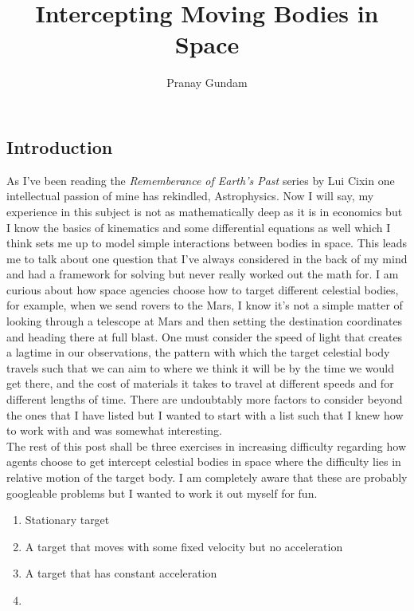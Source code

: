 \documentclass[11pt,english]{article}
\title{\textbf{Intercepting Moving Bodies in Space}}
\author{Pranay Gundam}
\begin{document}
\maketitle

\subsection*{Introduction}

\noindent As I've been reading the \textit{Rememberance of Earth's Past} series by Lui Cixin one intellectual passion of mine has rekindled, Astrophysics. Now I will say, my experience in this subject is not as mathematically deep as it is in economics but I know the basics of kinematics and some differential equations as well which I think sets me up to model simple interactions between bodies in space. This leads me to talk about one question that I've always considered in the back of my mind and had a framework for solving but never really worked out the math for. I am curious about how space agencies choose how to target different celestial bodies, for example, when we send rovers to the Mars, I know it's not a simple matter of looking through a telescope at Mars and then setting the destination coordinates and heading there at full blast. One must consider the speed of light that creates a lagtime in our observations, the pattern with which the target celestial body travels such that we can aim to where we think it will be by the time we would get there, and the cost of materials it takes to travel at different speeds and for different lengths of time. There are undoubtably more factors to consider beyond the ones that I have listed but I wanted to start with a list such that I knew how to work with and was somewhat interesting.\\

\noindent The rest of this post shall be three exercises in increasing difficulty regarding how agents choose to get intercept celestial bodies in space where the difficulty lies in relative motion of the target body. I am completely aware that these are probably googleable problems but I wanted to work it out myself for fun.
\begin{enumerate}
	\item Stationary target 
	\item A target that moves with some fixed velocity but no acceleration
	\item A target that has constant acceleration
	\item 
\end{enumerate}
\end{document}

